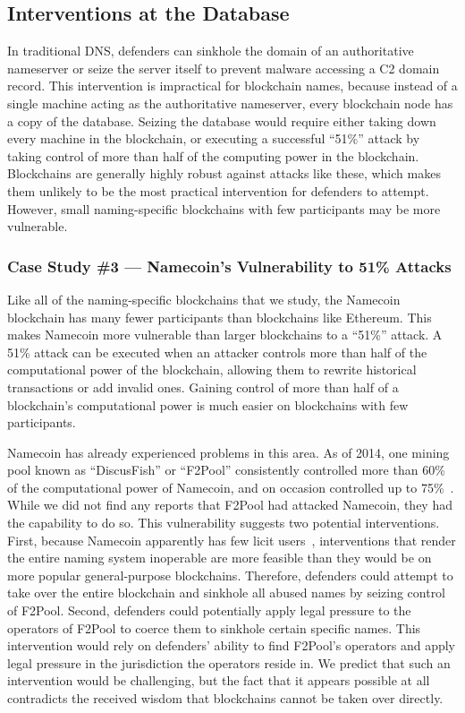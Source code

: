 \subsection{Interventions at the Database}

In traditional DNS, defenders can sinkhole the domain of an 
authoritative nameserver or seize the server itself to 
prevent malware accessing a C2 domain record. This 
intervention is impractical for blockchain names, 
because instead of a single machine acting as the 
authoritative nameserver, every blockchain node has a copy of 
the database. Seizing the database would require either taking down 
every machine in the blockchain, or executing a successful ``51\%'' attack by 
taking control of more than half of the computing power in the blockchain. 
Blockchains are generally highly robust against attacks like these, which makes 
them unlikely to be the most practical intervention for defenders to attempt. 
However, small naming-specific
blockchains with few participants may be more vulnerable. 

\subsubsection{Case Study \#3 --- Namecoin's Vulnerability to 51\% Attacks}

Like all of the naming-specific blockchains that we study, the Namecoin 
blockchain has many fewer participants than blockchains like Ethereum. This 
makes Namecoin more vulnerable than larger blockchains to a ``51\%'' attack. A 
51\% attack can be executed when an attacker controls more 
than half of the 
computational power of the blockchain, allowing them to rewrite historical 
transactions or add invalid ones. Gaining control of more than half of a 
blockchain's computational power is much easier on blockchains with few 
participants. 

Namecoin has already experienced problems in this area. As of 2014, one mining 
pool known as ``DiscusFish'' or ``F2Pool'' consistently controlled more than 
60\% of the computational power of Namecoin, and on 
occasion controlled up to 75\%~\cite{ali2016blockstack}. While we 
did not find any reports that F2Pool had attacked Namecoin, they had the 
capability to do so. This vulnerability suggests two 
potential interventions. 
First, because Namecoin apparently has few licit 
users~\cite{casino_unearthing_2021}, 
interventions that render the entire naming system inoperable are more feasible 
than they would be on more popular general-purpose blockchains. Therefore, 
defenders could attempt to take over the entire blockchain and sinkhole 
all abused names by seizing control of F2Pool. Second, 
defenders could potentially 
apply legal pressure to the operators of F2Pool to coerce them to sinkhole 
certain specific names. This intervention would rely on 
defenders' ability to find 
F2Pool's operators and apply legal pressure in the jurisdiction the operators 
reside in. We predict that such an intervention would be challenging, but the 
fact that it appears possible at all contradicts the received wisdom that 
blockchains cannot be taken over directly. 

